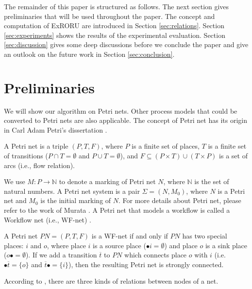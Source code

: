 \documentclass{llncs}
\begin{document}
The remainder of this paper is structured as follows. The next section gives preliminaries that will be used throughout the paper. The concept and computation of ExRORU are introduced in Section \ref{sec:relations}. Section \ref{sec:experiments} shows the results of the experimental evaluation. Section \ref{sec:discussion} gives some deep discussions before we conclude the paper and give an outlook on the future work in Section \ref{sec:conclusion}.

\section{Preliminaries}\label{sec:preliminaries}
We will show our algorithm on Petri nets. Other process models that could be converted to Petri nets are also applicable. The concept of Petri net has its origin in Carl Adam Petri's dissertation \cite{petri1966kommunikation}.

\begin{definition}\label{def:petrinet}
A Petri net is a triple $(P,T,F)$, where $P$ is a finite set of places, $T$ is a finite set of transitions ($P\cap T=\emptyset$ and $P\cup T=\emptyset$), and $F\subseteq(P\times T)\cup(T\times P)$ is a set of arcs (i.e., flow relation).
\end{definition}

We use $M:P\rightarrow\mathbb{N}$ to denote a marking of Petri net $N$, where $\mathbb{N}$ is the set of natural numbers. A Petri net system is a pair $\Sigma=(N,M_{0})$, where $N$ is a Petri net and $M_{0}$ is the initial marking of $N$. For more details about Petri net, please refer to the work of Murata \cite{murata1989petri}. A Petri net that models a workflow is called a Workflow net (i.e., WF-net) \cite{van1998application}.

\begin{definition}[WF-net]\label{def:wfnet}
A Petri net $PN=(P,T,F)$ is a WF-net if and only if $PN$ has two special places: $i$ and $o$, where place $i$ is a source place ($\bullet i=\emptyset$) and place $o$ is a sink place ($o\bullet =\emptyset$). If we add a transition $\overline{t}$ to $PN$ which connects place $o$ with $i$ (i.e. $\bullet \overline{t}=\{o\}$ and $\overline{t}\bullet=\{i\}$), then the resulting Petri net is strongly connected.
\end{definition}

According to \cite{esparza2002improvement}, there are three kinds of relations between nodes of a net.
\end{document}
